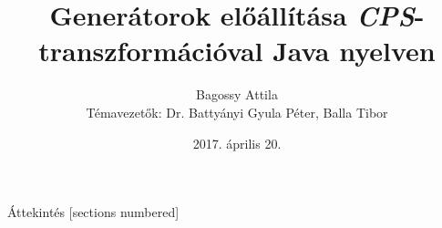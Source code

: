 \documentclass{beamer}
\title{Generátorok előállítása \textit{CPS}-transzformációval Java nyelven}
\date{2017. április 20.}
\author[My name]{Bagossy Attila\\ \footnotesize Témavezetők: Dr. Battyányi Gyula Péter, Balla Tibor \vspace{5em}}
\institute{Debreceni Egyetem, Informatikai Kar, Számítógéptudományi Tanszék}
\begin{document}
  \maketitle

  \begin{frame}{Áttekintés}
    [sections numbered]
    \tableofcontents[hideallsubsections]
  \end{frame}

  

  

  

\end{document}
